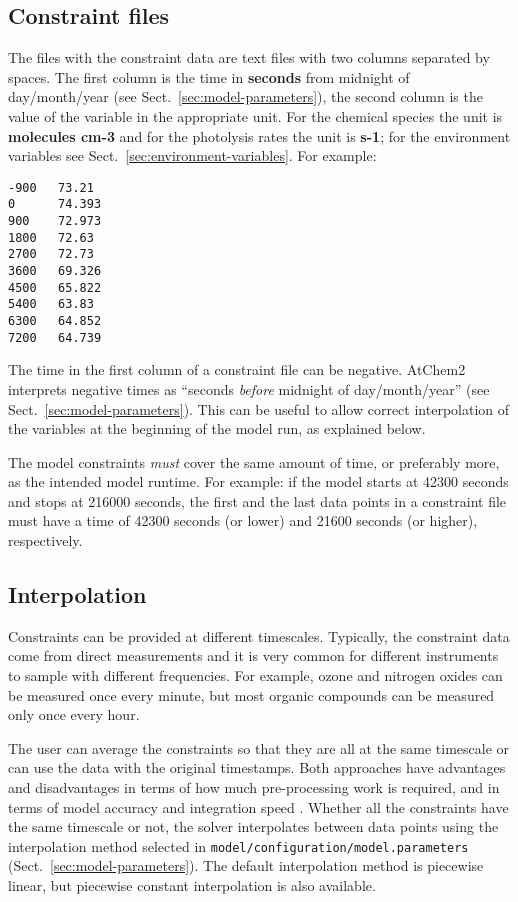 \subsection{Constraint files} \label{subsec:constraint-files}

The files with the constraint data are text files with two columns
separated by spaces. The first column is the time in \textbf{seconds}
from midnight of day/month/year (see Sect.~\ref{sec:model-parameters}),
the second column is the value of the variable in the appropriate
unit. For the chemical species the unit is \textbf{molecules cm-3} and
for the photolysis rates the unit is \textbf{s-1}; for the environment
variables see Sect.~\ref{sec:environment-variables}. For example:

\begin{verbatim}
-900   73.21
0      74.393
900    72.973
1800   72.63
2700   72.73
3600   69.326
4500   65.822
5400   63.83
6300   64.852
7200   64.739
\end{verbatim}

The time in the first column of a constraint file can be negative.
AtChem2 interprets negative times as ``seconds \emph{before} midnight
of day/month/year'' (see Sect.~\ref{sec:model-parameters}). This can
be useful to allow correct interpolation of the variables at the
beginning of the model run, as explained below.

The model constraints \emph{must} cover the same amount of time, or
preferably more, as the intended model runtime. For example: if the
model starts at 42300 seconds and stops at 216000 seconds, the first
and the last data points in a constraint file must have a time of
42300 seconds (or lower) and 21600 seconds (or higher), respectively.

\subsection{Interpolation} \label{subsec:interpolation}

Constraints can be provided at different timescales. Typically, the
constraint data come from direct measurements and it is very common
for different instruments to sample with different frequencies. For
example, ozone and nitrogen oxides can be measured once every minute,
but most organic compounds can be measured only once every hour.

The user can average the constraints so that they are all at the same
timescale or can use the data with the original timestamps. Both
approaches have advantages and disadvantages in terms of how much
pre-processing work is required, and in terms of model accuracy and
integration speed \citep{sommariva_2019}. Whether all the constraints
have the same timescale or not, the solver interpolates between data
points using the interpolation method selected in
\texttt{model/configuration/model.parameters}
(Sect.~\ref{sec:model-parameters}). The default interpolation method
is piecewise linear, but piecewise constant interpolation is also
available.

